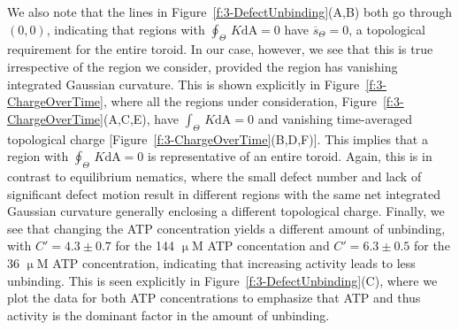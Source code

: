 We also note that the lines in Figure~\ref{f:3-DefectUnbinding}(A,B) both go through $(0,0)$, indicating that regions with $\oint_{\Theta}\,K\textrm{dA} = 0$ have $\overbar{s}_{\Theta} = 0$, a topological requirement for the entire toroid.
In our case, however, we see that this is true irrespective of the region we consider, provided the region has vanishing integrated Gaussian curvature.
This is shown explicitly in Figure~\ref{f:3-ChargeOverTime}, where all the regions under consideration, Figure~\ref{f:3-ChargeOverTime}(A,C,E), have $\int_{\Theta}\,K\textrm{dA} = 0$ and vanishing time-averaged topological charge [Figure~\ref{f:3-ChargeOverTime}(B,D,F)].
This implies that a region with $\oint_{\Theta}\,K\textrm{dA} = 0$ is representative of an entire toroid.
Again, this is in contrast to equilibrium nematics, where the small defect number and lack of significant defect motion result in different regions with the same net integrated Gaussian curvature generally enclosing a different topological charge.
Finally, we see that changing the ATP concentration yields a different amount of unbinding, with $C' = 4.3 \pm 0.7$ for the 144 $\upmu$M ATP concentation and $C' = 6.3 \pm 0.5$ for the 36 $\upmu$M ATP concentration, indicating that increasing activity leads to less unbinding.
This is seen explicitly in Figure~\ref{f:3-DefectUnbinding}(C), where we plot the data for both ATP concentrations to emphasize that ATP and thus activity is the dominant factor in the amount of unbinding.
